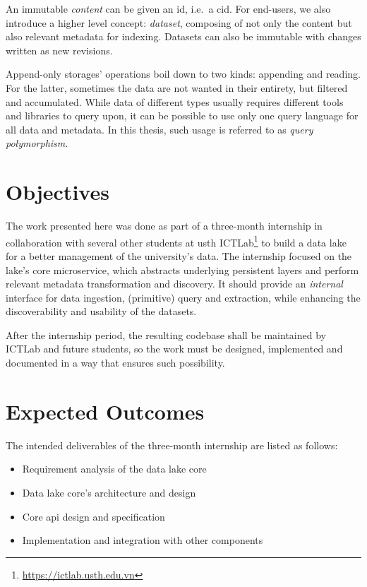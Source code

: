 An immutable \emph{\gls{content}} can be given an \gls{id}, i.e.~a \gls{cid}.
For end-users, we also introduce a higher level concept: \emph{dataset},
composing of not only the content but also relevant metadata for indexing.
Datasets can also be immutable with changes written as new revisions.

Append-only storages' operations boil down to two kinds: appending and reading.
For the latter, sometimes the data are not wanted in their entirety,
but filtered and accumulated.  While data of different types usually requires
different tools and libraries to query upon, it can be possible to use only one
query language for all data and metadata.
In this thesis, such usage is referred to as \emph{query polymorphism}.

\section{Objectives}
The work presented here was done as part of a three-month internship
in collaboration with several other students at \gls{usth}
ICTLab\footnote{\url{https://ictlab.usth.edu.vn}} to build a data lake
for a better management of the university's data.  The internship focused on
the lake's core microservice, which abstracts underlying persistent layers
and perform relevant metadata transformation and discovery.  It should provide
an \emph{internal} interface for data ingestion, (primitive) query and
extraction, while enhancing the discoverability and usability of the datasets.

After the internship period, the resulting codebase shall be maintained
by ICTLab and future students, so the work must be designed, implemented
and documented in a way that ensures such possibility.

\section{Expected Outcomes}
The intended deliverables of the three-month internship are listed as follows:
\begin{itemize}
  \item Requirement analysis of the data lake core
  \item Data lake core's architecture and design
  \item Core \gls{api} design and specification
  \item Implementation and integration with other components
\end{itemize}
